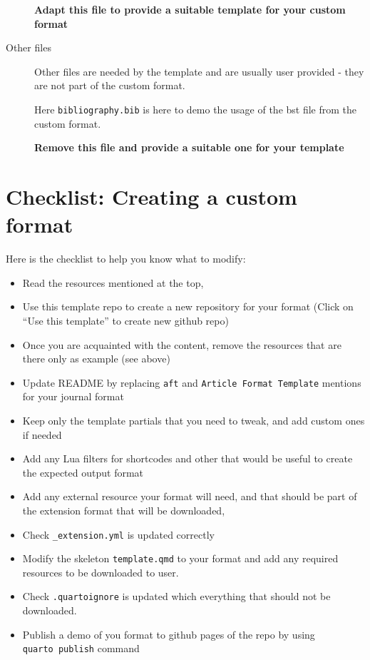 \documentclass[
  11pts,
]{article}
\providecommand{\tightlist}{%
  \setlength{\itemsep}{0pt}\setlength{\parskip}{0pt}}\usepackage{longtable,booktabs,array}
\begin{document}
\begin{description}
\textbf{Adapt this file to provide a suitable template for your custom
format}
\item[Other files]
Other files are needed by the template and are usually user provided -
they are not part of the custom format.

Here \texttt{bibliography.bib} is here to demo the usage of the bst file
from the custom format.

\textbf{Remove this file and provide a suitable one for your template}
\end{description}

\newpage{}

\section{Checklist: Creating a custom
format}\label{checklist-creating-a-custom-format}

Here is the checklist to help you know what to modify:

\begin{itemize}
\tightlist
\item
  Read the resources mentioned at the top,
\item
  Use this template repo to create a new repository for your format
  (Click on ``Use this template'' to create new github repo)
\item
  Once you are acquainted with the content, remove the resources that
  are there only as example (see above)
\item
  Update README by replacing \texttt{aft} and
  \texttt{Article\ Format\ Template} mentions for your journal format
\item
  Keep only the template partials that you need to tweak, and add custom
  ones if needed
\item
  Add any Lua filters for shortcodes and other that would be useful to
  create the expected output format
\item
  Add any external resource your format will need, and that should be
  part of the extension format that will be downloaded,
\item
  Check \texttt{\_extension.yml} is updated correctly
\item
  Modify the skeleton \texttt{template.qmd} to your format and add any
  required resources to be downloaded to user.
\item
  Check \texttt{.quartoignore} is updated which everything that should
  not be downloaded.
\item
  Publish a demo of you format to github pages of the repo by using
  \texttt{quarto\ publish} command
\end{itemize}
\end{document}
